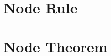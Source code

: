 \documentclass[master.tex]{subfiles}
\begin{document}







\section{Node Rule}
\section{Node Theorem}



\end{document}
